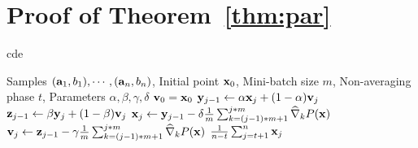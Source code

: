\section{Proof of Theorem~\ref{thm:par}}\label{sec:thm-par}
\begin{algorithm}[t]
	\caption{ cde}%
	\begin{algorithmic}[1]
		\INPUT Samples $(\ai[1],\bi[1]),\cdots,(\ai[n],\bi[n])$, Initial point $\xt[0]$, Mini-batch size $m$, Non-averaging phase $t$, Parameters $\alpha, \beta, \gamma, \delta$
		\STATE $\vt[0] = \xt[0]$
		\STATE $\yt[j-1] \leftarrow \alpha \xt[j] + (1-\alpha) \vt[j]$
		\STATE $\zt[j-1] \leftarrow \beta \yt[j] + (1-\beta) \vt[j]$
		\STATE $\xt[j] \leftarrow \yt[j-1] - \delta \frac{1}{m} \sum_{k=(j-1)*m+1}^{j*m} \widehat{\nabla}_k P(\x)$
		\STATE $\vt[j] \leftarrow \zt[j-1] - \gamma \frac{1}{m} \sum_{k=(j-1)*m+1}^{j*m} \widehat{\nabla}_k P(\x)$
		\ENDFOR
		\OUTPUT $\frac{1}{n-t}\sum_{j=t+1}^{n} \xt[j]$
	\end{algorithmic}
\end{algorithm}

